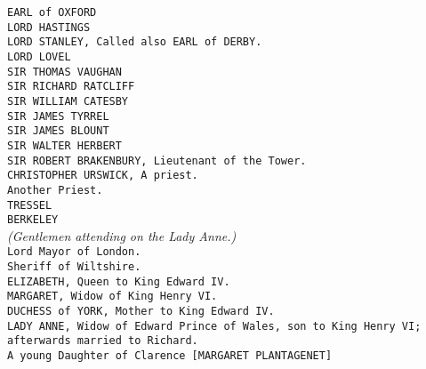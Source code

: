 \documentclass{article}
\begin{document}
{\tt EARL of OXFORD}\\

{\tt LORD HASTINGS}\\

{\tt LORD STANLEY, Called also EARL of DERBY. }\\

{\tt LORD LOVEL}\\

{\tt SIR THOMAS VAUGHAN}\\

{\tt SIR RICHARD RATCLIFF}\\

{\tt SIR WILLIAM CATESBY}\\

{\tt SIR JAMES TYRREL}\\

{\tt SIR JAMES BLOUNT}\\

{\tt SIR WALTER HERBERT}\\

{\tt SIR ROBERT BRAKENBURY, Lieutenant of the Tower. }\\

{\tt CHRISTOPHER URSWICK, A priest. }\\

{\tt Another Priest. }\\

{\tt TRESSEL}\\
{\tt BERKELEY}\\
{\it (Gentlemen attending on the Lady Anne.)}\\

{\tt Lord Mayor of London. }\\

{\tt Sheriff of Wiltshire. }\\

{\tt ELIZABETH, Queen to King Edward IV. }\\

{\tt MARGARET, Widow of King Henry VI. }\\

{\tt DUCHESS of YORK, Mother to King Edward IV.}\\

{\tt LADY ANNE, Widow of Edward Prince of Wales, son to King Henry VI; afterwards married to Richard.}\\

{\tt A young Daughter of Clarence [MARGARET PLANTAGENET] }\\
\end{document}
